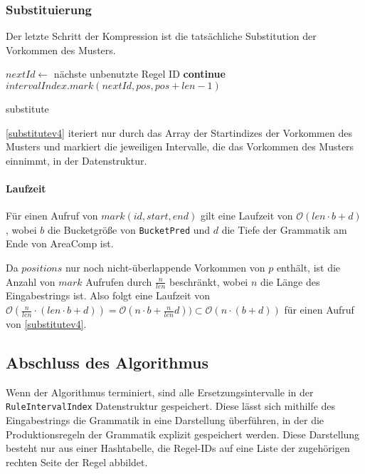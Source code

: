 \subsubsection{Substituierung}

Der letzte Schritt der Kompression ist die tatsächliche Substitution der Vorkommen des Musters.
\begin{algorithm}[t]
        $nextId \leftarrow$ nächste unbenutzte Regel ID\;
         {
             {
                \textbf{continue}\;
            }
            $intervalIndex.mark(nextId, pos, pos + len - 1)$\;
        }
        \caption{substitute}
        \label{substitutev4}
\end{algorithm}

\autoref{substitutev4} iteriert nur durch das Array der Startindizes der Vorkommen des Musters und markiert die jeweiligen Intervalle, die das Vorkommen des Musters einnimmt, in der Datenstruktur. 

\paragraph{Laufzeit}

Für einen Aufruf von $mark(id, start, end)$ gilt eine Laufzeit von $\mathcal{O}(len \cdot b + d)$, wobei $b$ die Bucketgröße von \texttt{BucketPred} und $d$ die Tiefe der Grammatik am Ende von AreaComp ist.

Da $positions$ nur noch nicht-überlappende Vorkommen von $p$ enthält, ist die Anzahl von $mark$ Aufrufen durch $\frac{n}{len}$ beschränkt, wobei $n$ die Länge des Eingabestrings ist.
Also folgt eine Laufzeit von $\mathcal{O}(\tfrac{n}{len} \cdot (len \cdot b + d)) = \mathcal{O}(n \cdot b + \tfrac{n}{len} d)) \subset \mathcal{O}(n \cdot (b + d))$ für einen Aufruf von \autoref{substitutev4}. 

\subsection{Abschluss des Algorithmus}

Wenn der Algorithmus terminiert, sind alle Ersetzungsintervalle in der \texttt{RuleIntervalIndex} Datenstruktur gespeichert.
Diese lässt sich mithilfe des Eingabestrings die Grammatik in eine Darstellung überführen, in der die Produktionsregeln der Grammatik explizit gespeichert werden. Diese Darstellung besteht nur aus einer Hashtabelle, die Regel-IDs auf eine Liste der zugehörigen rechten Seite der Regel abbildet.

